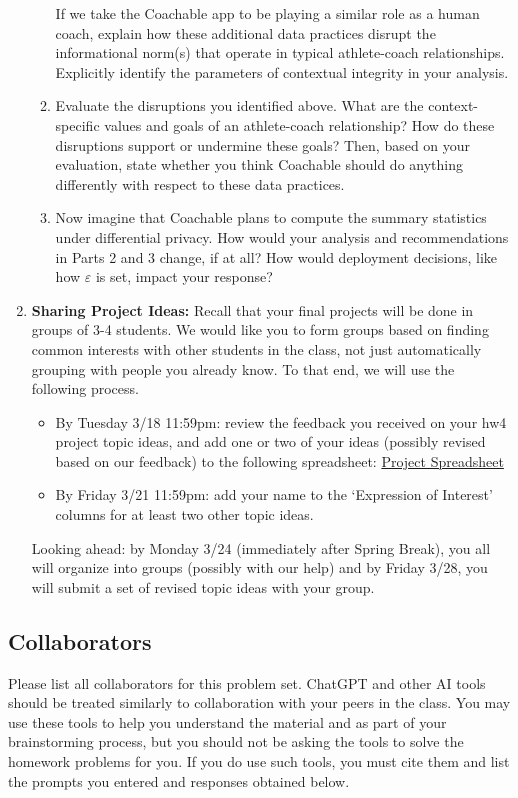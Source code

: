 \documentclass[11pt]{article}
\begin{document}
\begin{enumerate}[leftmargin=*]
\begin{enumerate}
    If we take the Coachable app to be playing a similar role as a human coach, explain how these additional data practices disrupt the informational norm(s) that operate in typical athlete-coach relationships. Explicitly identify the parameters of contextual integrity in your analysis.

    \item Evaluate the disruptions you identified above. What are the context-specific values and goals of an athlete-coach relationship? How do these disruptions support or undermine these goals? Then, based on your evaluation, state whether you think Coachable should do anything differently with respect to these data practices. 

    \item Now imagine that Coachable plans to compute the summary statistics under differential privacy. How would your analysis and recommendations in Parts 2 and 3 change, if at all? How would deployment decisions, like how $\varepsilon$ is set, impact your response?

    \end{enumerate}

\item \textbf{Sharing Project Ideas:}
Recall that your final projects will be done in groups of 3-4 students. We would like you to form groups based on finding common interests with other students in the class, not just automatically grouping with people you already know. To that end, we will use the following process.
\begin{itemize}
    \item By Tuesday 3/18 11:59pm: review the feedback you received on your hw4 project topic ideas, and add one or two of your ideas (possibly revised based on our feedback) to the following spreadsheet: \href{https://docs.google.com/spreadsheets/d/1gxPtxZU835YJ_yZbDQtneGnusvXHWax4sDi-fodu2wA/edit?gid=0#gid=0}{Project Spreadsheet} 
    \item By Friday 3/21 11:59pm: add your name to the `Expression of Interest' columns for at least two other topic ideas.
\end{itemize}
Looking ahead: by Monday 3/24 (immediately after Spring Break), you all will organize into groups (possibly with our help) and by Friday 3/28, you will submit a set of revised topic ideas with your group.
\end{enumerate}

\subsection*{Collaborators}
Please list all collaborators for this problem set. ChatGPT and other AI tools should be treated similarly to collaboration with your peers in the 
class.  You may use these tools to help you understand the material and as part of your 
brainstorming process, but you should not be asking the tools to solve the homework problems 
for you. If you do use such tools, you must cite them and  list the 
prompts you entered and responses obtained below.
\end{document}

